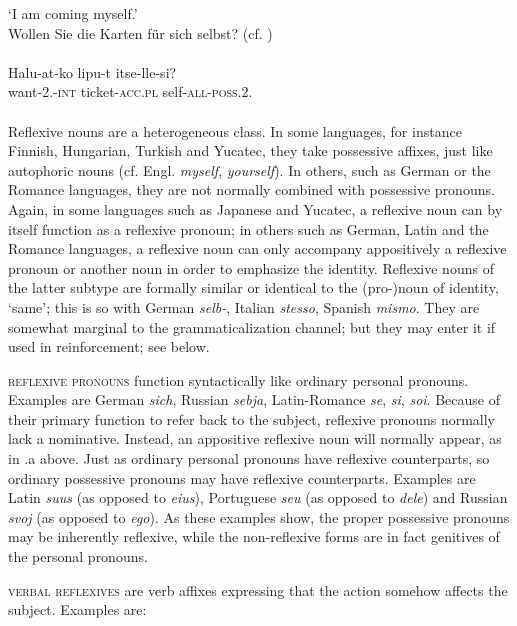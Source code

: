\glt ‘I am coming myself.’\\
\ex 
Wollen Sie die Karten für sich selbst?  {\upshape (cf. )}\\
\z
\z
\noindent \ea\label{ex:E15}
\langinfo{\LangFinn}{}{}\\
\gll Halu-at-ko  lipu-t  itse-lle-si?\\
 want-2.\glsg-\textsc{int}  ticket-\textsc{acc}.\textsc{pl}  self-\textsc{all}-\textsc{poss}.2.\glsg\\
\\
\z
\noindent 
Reflexive nouns are a heterogeneous class. In some languages, for instance Finnish, Hungarian, Turkish and Yucatec, they take possessive affixes, just like autophoric nouns (cf. Engl. \textit{myself}, \textit{yourself}). In others, such as German or the Romance languages, they are not normally combined with possessive pronouns. Again, in some languages such as Japanese and Yucatec, a reflexive noun can by itself function as a reflexive pronoun; in others such as German, Latin and the Romance languages, a reflexive noun can only accompany appositively a reflexive pronoun or another noun in order to emphasize the identity. Reflexive nouns of the latter subtype are formally similar or identical to the (pro-)noun of identity, ‘same’; this is so with German \textit{selb-}, Italian \textit{stesso}, Spanish \textit{mismo}. They are somewhat marginal to the grammaticalization channel; but they may enter it if used in reinforcement; see below.

\textsc{reflexive pronouns} function syntactically like ordinary personal pronouns. Examples are German \textit{sich}, Russian \textit{sebja}, Latin-Romance \textit{se}, \textit{si}, \textit{soi}. Because of their primary function to refer back to the subject, reflexive pronouns normally lack a nominative. Instead, an appositive reflexive noun will normally appear, as in .a above. Just as ordinary personal pronouns have reflexive counterparts, so ordinary possessive pronouns may have reflexive counterparts. Examples are Latin \textit{suus} (as opposed to \textit{eius}), Portuguese \textit{seu} (as opposed to \textit{dele}) and Russian \textit{svoj} (as opposed to \textit{ego}). As these examples show, the proper possessive pronouns may be inherently reflexive, while the non-reflexive forms are in fact genitives of the personal pronouns.

\textsc{verbal reflexives} are verb affixes expressing that the action somehow affects the subject. Examples are:

